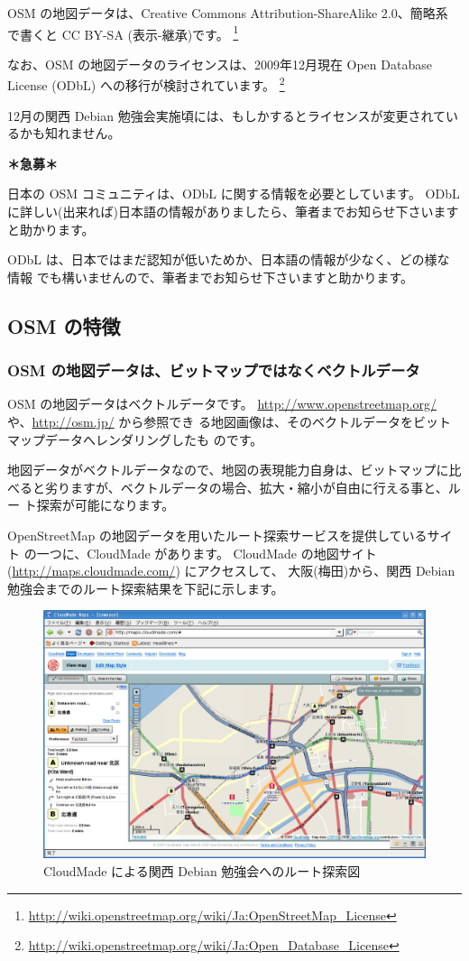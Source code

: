 \documentclass[mingoth,a4paper]{jsarticle}
\begin{document}
OSM の地図データは、Creative Commons Attribution-ShareAlike 2.0、簡略系
で書くと CC BY-SA (表示-継承)です。
\footnote{\url{http://wiki.openstreetmap.org/wiki/Ja:OpenStreetMap_License}}

なお、OSM の地図データのライセンスは、2009年12月現在 Open Database License (ODbL) への移行が検討されています。
\footnote{\url{http://wiki.openstreetmap.org/wiki/Ja:Open_Database_License}}

12月の関西 Debian 勉強会実施頃には、もしかするとライセンスが変更されているかも知れません。

\textbf{{\large ＊急募＊} }

日本の OSM コミュニティは、ODbL に関する情報を必要としています。
ODbL に詳しい(出来れば)日本語の情報がありましたら、筆者までお知らせ下さいますと助かります。

ODbL は、日本ではまだ認知が低いためか、日本語の情報が少なく、どの様な情報
でも構いませんので、筆者までお知らせ下さいますと助かります。

\subsection{OSM の特徴}

\subsubsection{OSM の地図データは、ビットマップではなくベクトルデータ}

OSM の地図データはベクトルデータです。
\url{http://www.openstreetmap.org/} や、\url{http://osm.jp/} から参照でき
る地図画像は、そのベクトルデータをビットマップデータへレンダリングしたも
のです。

地図データがベクトルデータなので、地図の表現能力自身は、ビットマップに比
べると劣りますが、ベクトルデータの場合、拡大・縮小が自由に行える事と、ルー
ト探索が可能になります。

OpenStreetMap の地図データを用いたルート探索サービスを提供しているサイト
の一つに、CloudMade があります。
CloudMade の地図サイト (\url{http://maps.cloudmade.com/}) にアクセスして、
大阪(梅田)から、関西 Debian 勉強会までのルート探索結果を下記に示します。

\begin{figure}[h]
 \centering
 \includegraphics[scale=0.4]{image200912/debianosm2.png}
 \caption{CloudMade による関西 Debian 勉強会へのルート探索図}
\end{figure}
\end{document}
